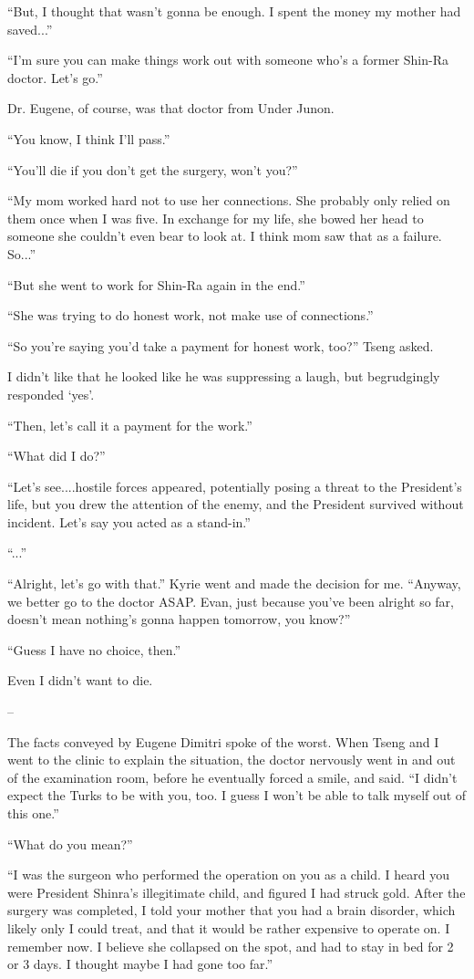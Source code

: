 \documentclass[oneside]{book}
\begin{document}
“But, I thought that wasn’t gonna be enough. I spent the money my mother had saved...”

“I’m sure you can make things work out with someone who’s a former Shin-Ra doctor. Let’s go.”

Dr. Eugene, of course, was that doctor from Under Junon.

“You know, I think I’ll pass.”

“You’ll die if you don’t get the surgery, won’t you?”

“My mom worked hard not to use her connections. She probably only relied on them once when I was five. In exchange for my life, she bowed her head to someone she couldn’t even bear to look at. I think mom saw that as a failure. So...”

“But she went to work for Shin-Ra again in the end.”

“She was trying to do honest work, not make use of connections.”

“So you’re saying you’d take a payment for honest work, too?” Tseng asked.

I didn’t like that he looked like he was suppressing a laugh, but begrudgingly responded ‘yes’.

“Then, let’s call it a payment for the work.”

“What did I do?”

“Let’s see....hostile forces appeared, potentially posing a threat to the President’s life, but you drew the attention of the enemy, and the President survived without incident. Let’s say you acted as a stand-in.”

“...”

“Alright, let’s go with that.” Kyrie went and made the decision for me. “Anyway, we better go to the doctor ASAP. Evan, just because you’ve been alright so far, doesn’t mean nothing’s gonna happen tomorrow, you know?”

“Guess I have no choice, then.”

Even I didn’t want to die.

–

The facts conveyed by Eugene Dimitri spoke of the worst. When Tseng and I went to the clinic to explain the situation, the doctor nervously went in and out of the examination room, before he eventually forced a smile, and said. “I didn’t expect the Turks to be with you, too. I guess I won’t be able to talk myself out of this one.”

“What do you mean?”

“I was the surgeon who performed the operation on you as a child. I heard you were President Shinra’s illegitimate child, and figured I had struck gold. After the surgery was completed, I told your mother that you had a brain disorder, which likely only I could treat, and that it would be rather expensive to operate on. I remember now. I believe she collapsed on the spot, and had to stay in bed for 2 or 3 days. I thought maybe I had gone too far.”
\end{document}
